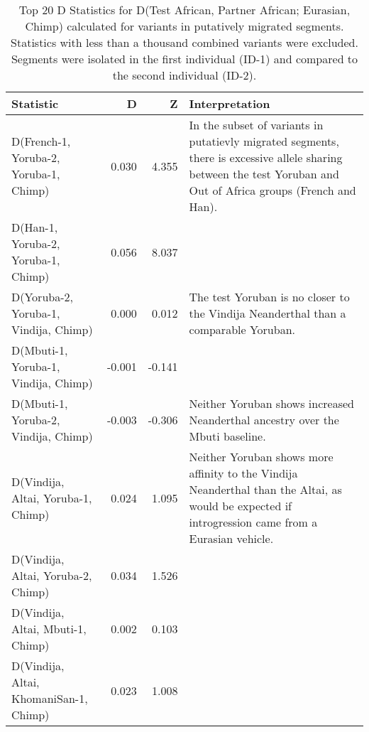 \begin{table}[ht]
\centering
\begin{tabular}{lrrl}
  \hline
Statistic & D & Z & Interpretation \\ 
  \hline
D(French-1, Yoruba-2, Yoruba-1, Chimp) & 0.030 & 4.355 & In the subset of variants in putatievly migrated segments, there is excessive allele sharing between the test Yoruban and Out of Africa groups (French and Han). \\ 
  D(Han-1, Yoruba-2, Yoruba-1, Chimp) & 0.056 & 8.037 &  \\ 
  D(Yoruba-2, Yoruba-1, Vindija, Chimp) & 0.000 & 0.012 & The test Yoruban is no closer to the Vindija Neanderthal than a comparable Yoruban. \\ 
  D(Mbuti-1, Yoruba-1, Vindija, Chimp) & -0.001 & -0.141 &  \\ 
  D(Mbuti-1, Yoruba-2, Vindija, Chimp) & -0.003 & -0.306 & Neither Yoruban shows increased Neanderthal ancestry over the Mbuti baseline. \\ 
  D(Vindija, Altai, Yoruba-1, Chimp) & 0.024 & 1.095 & Neither Yoruban shows more affinity to the Vindija Neanderthal than the Altai, as would be expected if introgression came from a Eurasian vehicle. \\ 
  D(Vindija, Altai, Yoruba-2, Chimp) & 0.034 & 1.526 &  \\ 
  D(Vindija, Altai, Mbuti-1, Chimp) & 0.002 & 0.103 &  \\ 
  D(Vindija, Altai, KhomaniSan-1, Chimp) & 0.023 & 1.008 &  \\ 
   \hline
\end{tabular}
\caption{Top 20 D Statistics for D(Test African, Partner African; Eurasian, Chimp) calculated for variants in putatively migrated segments. Statistics with less than a thousand combined variants were excluded. Segments were isolated in the first individual (ID-1) and compared to the second individual (ID-2).} 
\label{table:dstats_summary}
\end{table}
